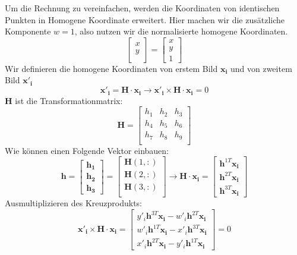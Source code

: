 \documentclass[12pt]{article}
\begin{document}
\noindent Um die Rechnung zu vereinfachen, werden die Koordinaten von identischen Punkten in Homogene Koordinate erweitert. Hier machen wir die zusätzliche Komponente $w=1$, also nutzen wir die normalisierte homogene Koordinaten.
\begin{equation*}
\begin{bmatrix}
x\\
y\\
\end{bmatrix} = \begin{bmatrix}
x\\
y\\
1
\end{bmatrix}
\end{equation*}
Wir definieren die homogene Koordinaten von erstem Bild $\bm{x_i}$ und von zweitem Bild $\bm{x'_i}$
\begin{equation*}
\bm{x'_i} = \bm{H} \cdot \bm{x_i} \longrightarrow \bm{x'_i} \times \bm{H} \cdot \bm{x_i} = 0
\end{equation*}
$\bm{H}$ ist die Transformationmatrix:
\begin{equation*}
\bm{H} = \begin{bmatrix}
h_1 & h_2 & h_3\\
h_4 & h_5 & h_6\\
h_7 & h_8 & h_9\\
\end{bmatrix}
\end{equation*}
Wie können einen Folgende Vektor einbauen:
\begin{equation*}
\bm{h} = \begin{bmatrix}
\bm{h_1}\\
\bm{h_2}\\
\bm{h_3}
\end{bmatrix} = \begin{bmatrix}
\bm{H}(1,:)\\
\bm{H}(2,:)\\
\bm{H}(3,:)\\
\end{bmatrix} \longrightarrow \bm{H}\cdot \bm{x_i} = \begin{bmatrix}
\bm{h}^{1T}\bm{x_i}  \\
\bm{h}^{2T}\bm{x_i}  \\
\bm{h}^{3T}\bm{x_i}
\end{bmatrix}
\end{equation*}
Ausmultiplizieren des Kreuzprodukts:
\begin{equation*}
\bm{x'_i} \times \bm{H} \cdot \bm{x_i} = \begin{bmatrix}
y'_i \bm{h}^{3T}\bm{x_i} - w'_i \bm{h}^{2T}\bm{x_i} \\
w'_i \bm{h}^{1T}\bm{x_i} - x'_i \bm{h}^{3T}\bm{x_i} \\
x'_i \bm{h}^{2T}\bm{x_i} - y'_i \bm{h}^{1T}\bm{x_i}
\end{bmatrix} = 0
\end{equation*}
\end{document}
